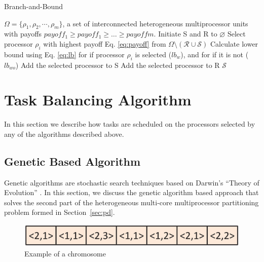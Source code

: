 \documentclass[conference]{IEEEtran}
\begin{document}
\begin{algorithm}
	\caption{Branch-and-Bound} \label{algo:bab}
	\footnotesize
	\begin{algorithmic}[1]
		\REQUIRE $\Omega = \{\rho_1, \rho_2,\cdots, \rho_m\}$, a set of interconnected heterogeneous multiprocessor units with payoffs $payoff_{1} \ge payoff_{1} \ge \ldots \ge payoff{m}$.
		\STATE Initiate {\cal S} and {\cal R} to $\varnothing$
		 \label{while1}
			\STATE Select processor $\rho_i$ with highest payoff Eq. \ref{eq:payoff} from $\Omega \setminus (\mathcal{R} \cup \mathcal{S})$
			\STATE Calculate lower bound using Eq. \ref{eq:lb} for if processor $\rho_i$ is selected ($lb_w$), and for if it is not ($lb_{wo}$)
			 \label{if1}
				\STATE Add the selected processor to {\cal S}
			\ELSE \label{else1}
				\STATE Add the selected processor to {\cal R}
			\ENDIF
		\ENDWHILE
		\RETURN $\mathcal{S}$ \label{return1}
	\end{algorithmic}
\end{algorithm}



\section{Task Balancing Algorithm}
In this section we describe how tasks are scheduled on the processors selected by any of the algorithms described above.

\subsection{Genetic Based Algorithm}
Genetic algorithms are stochastic search techniques based on Darwin's ``Theory of Evolution'' \cite{Goldberg}.
In this section, we discuss the genetic algorithm based approach that solves the second part of the heterogeneous multi-core multiprocessor partitioning problem formed in Section~\ref{sec:pd}.


\begin{figure}[h]
\vspace{-0.1in}
	\begin{center}
		\includegraphics[scale=0.35]{chromo.eps}
	\end{center}
	\vspace{-0.2in}
		\caption{Example of a chromosome}
	\label{fig:chromosome}
\end{figure}
\vspace{-0.1in}
\end{document}
